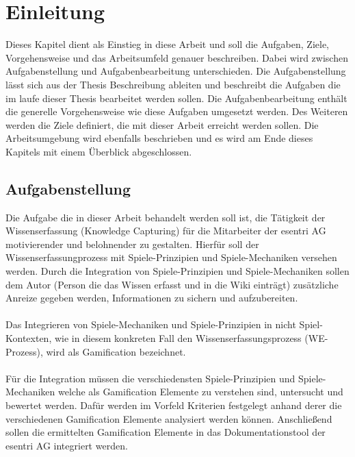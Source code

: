 \documentclass[a4paper,12pt]{scrartcl}
\begin{document}
\section{Einleitung}
Dieses Kapitel dient als Einstieg in diese Arbeit und soll die Aufgaben, Ziele, Vorgehensweise und das Arbeitsumfeld genauer beschreiben. Dabei wird zwischen Aufgabenstellung und Aufgabenbearbeitung unterschieden. Die Aufgabenstellung lässt sich aus der Thesis Beschreibung ableiten und beschreibt die Aufgaben die im laufe dieser Thesis bearbeitet werden sollen. Die Aufgabenbearbeitung enthält die generelle Vorgehensweise wie diese Aufgaben umgesetzt werden. Des Weiteren werden die Ziele definiert, die mit dieser Arbeit erreicht werden sollen. Die Arbeitsumgebung wird ebenfalls beschrieben und es wird am Ende dieses Kapitels mit einem Überblick abgeschlossen. 
\subsection{Aufgabenstellung}
Die Aufgabe die in dieser Arbeit behandelt werden soll ist, die Tätigkeit der Wissenserfassung (Knowledge Capturing) für die Mitarbeiter der esentri AG motivierender und belohnender zu gestalten. Hierfür soll der Wissenserfassungprozess mit Spiele-Prinzipien und Spiele-Mechaniken versehen werden. Durch die Integration von Spiele-Prinzipien und Spiele-Mechaniken sollen dem Autor (Person die das Wissen erfasst und in die Wiki einträgt) zusätzliche Anreize gegeben werden, Informationen zu sichern und aufzubereiten. 
\\\\
Das Integrieren von Spiele-Mechaniken und Spiele-Prinzipien in nicht Spiel-Kontexten, wie in diesem konkreten Fall den Wissenserfassungsprozess (WE-Prozess), wird als Gamification bezeichnet.
\\\\
Für die Integration müssen die verschiedensten Spiele-Prinzipien und Spiele-Mechaniken welche als Gamification Elemente zu verstehen sind, untersucht und bewertet werden. Dafür werden im Vorfeld Kriterien festgelegt anhand derer die verschiedenen Gamification Elemente analysiert werden können. Anschließend sollen die ermittelten Gamification Elemente in das Dokumentationstool der esentri AG integriert werden. 
\end{document}
